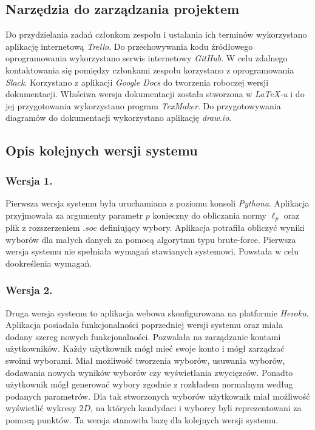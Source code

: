 \documentclass[polish,11pt]{aghthesis}
\begin{document}
\subsection{Narzędzia do zarządzania projektem}
Do przydzielania zadań członkom zespołu i ustalania ich terminów wykorzystano aplikację
internetową \textit{Trello}. Do przechowywania kodu źródłowego oprogramowania wykorzystano
serwis internetowy \textit{GitHub}. W celu zdalnego kontaktowania się pomiędzy członkami zespołu korzystano z oprogramowania \textit{Slack}. Korzystano z aplikacji \textit{Google Docs }do tworzenia roboczej wersji dokumentacji. Właściwa wersja dokumentacji została stworzona w \textit{LaTeX-u} i do jej przygotowania wykorzystano program \textit{TexMaker}. Do przygotowywania diagramów do dokumentacji wykorzystano aplikację \textit{draw.io}.

\subsection{Opis kolejnych wersji systemu}
\subsubsection{Wersja 1.}
Pierwsza wersja systemu była uruchamiana z poziomu konsoli \textit{Pythona}. Aplikacja
przyjmowała za argumenty parametr $p$ konieczny do obliczania normy $\ell_p$ oraz plik z
rozszerzeniem $.soc$ definiujący wybory. Aplikacja potrafiła obliczyć wyniki wyborów dla
małych danych za pomocą algorytmu typu brute-force. Pierwsza wersja systemu nie spełniała wymagań stawianych systemowi. Powstała w celu dookreślenia wymagań.

\subsubsection{Wersja 2.}
Druga wersja systemu to aplikacja webowa skonfigurowana na platformie \textit{Heroku}. Aplikacja
posiadała funkcjonalności poprzedniej wersji systemu oraz miała dodany szereg nowych
funkcjonalności. Pozwalała na zarządzanie kontami użytkowników. Każdy użytkownik mógł
mieć swoje konto i mógł zarządzać swoimi wyborami. Miał możliwość tworzenia wyborów,
usuwania wyborów, dodawania nowych wyników wyborów czy wyświetlania zwycięzców.
Ponadto użytkownik mógł generować wybory zgodnie z rozkładem normalnym według
podanych parametrów. Dla tak stworzonych wyborów użytkownik miał możliwość wyświetlić
wykresy $2D$, na których kandydaci i wyborcy byli reprezentowani za pomocą punktów. Ta
wersja stanowiła bazę dla kolejnych wersji systemu.
\end{document}
